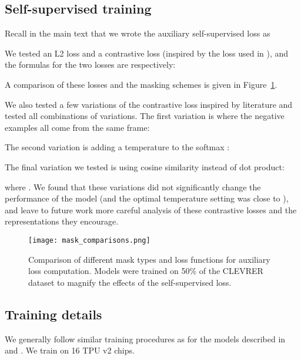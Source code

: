 \documentclass{article}
\begin{document}
\subsection{Self-supervised training}
\label{appendix:self-supervised-formulas}
Recall in the main text that we wrote the auxiliary self-supervised loss as 

We tested an L2 loss and a contrastive loss (inspired by the loss used in \citep{Han19dpc}),
and the formulas for the two losses are respectively:

A comparison of these losses and the masking schemes is given in Figure~\ref{fig:auxiliary-comparison}.

We also tested a few variations of the contrastive loss inspired by literature and tested all combinations of variations.
The first variation is where the negative examples all come from the same frame:

The second variation is adding a temperature  to the softmax \citep{chen2020simple}:

The final variation we tested is using cosine similarity instead of dot product:

where .
We found that these variations did not significantly change the performance of the model (and the optimal temperature setting was close to ),
and leave to future work more careful analysis of these contrastive losses and the representations they encourage.


\begin{figure}[]
    \centering
    \texttt{[image: mask\_comparisons.png]}
    \caption{Comparison of different mask types and loss functions for auxiliary loss computation. Models were trained on 50\% of the CLEVRER dataset to magnify the effects of the self-supervised loss.
    }
    \label{fig:auxiliary-comparison}
\end{figure}

\subsection{Training details}
\label{appendix:hyperparameters}
We generally follow similar training procedures as for the models described
in
\citep{clevrer} and \citep{cater}.
We train on 16 TPU v2 chips.
\end{document}
